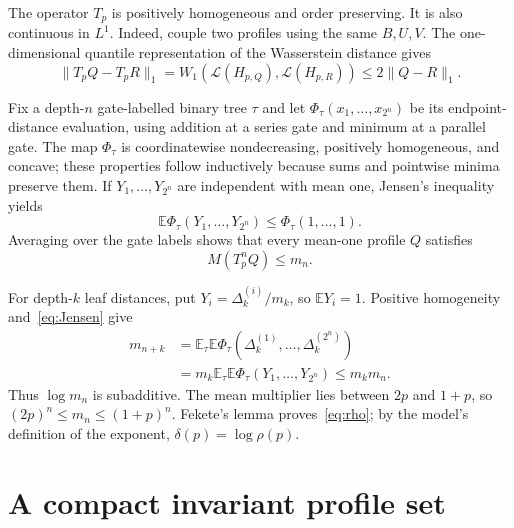 \documentclass[a4paper,11pt]{amsart}
\theoremstyle{remark}
\begin{document}
The operator $T_p$ is positively homogeneous and order preserving. It is also continuous in $L^1$. Indeed, couple two profiles using the same $B,U,V$. The one-dimensional quantile representation of the Wasserstein distance gives
\begin{equation}\label{eq:L1cont}
 \|T_pQ-T_pR\|_1
 =W_1(\mathcal L(H_{p,Q}),\mathcal L(H_{p,R}))
 \le2\|Q-R\|_1.
\end{equation}

Fix a depth-$n$ gate-labelled binary tree $\tau$ and let $\Phi_\tau(x_1,\ldots,x_{2^n})$ be its endpoint-distance evaluation, using addition at a series gate and minimum at a parallel gate. The map $\Phi_\tau$ is coordinatewise nondecreasing, positively homogeneous, and concave; these properties follow inductively because sums and pointwise minima preserve them. If $Y_1,\ldots,Y_{2^n}$ are independent with mean one, Jensen's inequality yields
\begin{equation}\label{eq:Jensen}
 \mathbb E\Phi_\tau(Y_1,\ldots,Y_{2^n})
 \le \Phi_\tau(1,\ldots,1).
\end{equation}
Averaging over the gate labels shows that every mean-one profile $Q$ satisfies
\begin{equation}\label{eq:JensenOperator}
 M(T_p^nQ)\le m_n.
\end{equation}

For depth-$k$ leaf distances, put $Y_i=\Delta_k^{(i)}/m_k$, so $\mathbb EY_i=1$. Positive homogeneity and~\eqref{eq:Jensen} give
\[
 \begin{aligned}
 m_{n+k}
 &=\mathbb E_\tau\mathbb E\Phi_\tau(\Delta_k^{(1)},\ldots,\Delta_k^{(2^n)})\\
 &=m_k\mathbb E_\tau\mathbb E\Phi_\tau(Y_1,\ldots,Y_{2^n})
 \le m_km_n.
 \end{aligned}
\]
Thus $\log m_n$ is subadditive. The mean multiplier lies between $2p$ and $1+p$, so $(2p)^n\le m_n\le(1+p)^n$. Fekete's lemma proves~\eqref{eq:rho}; by the model's definition of the exponent, $\delta(p)=\log\rho(p)$.

\section{A compact invariant profile set}
\end{document}
